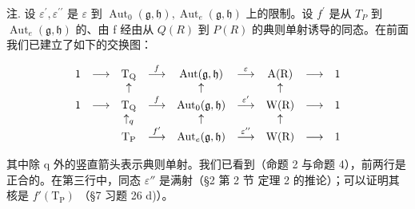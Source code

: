 注. 设 \(\varepsilon^{\prime},\varepsilon^{\prime\prime}\) 是 \(\varepsilon\) 到 \(\operatorname{Aut}_{0}(\mathfrak{g},\mathfrak{h}),\operatorname{Aut}_{e}(\mathfrak{g},\mathfrak{h})\) 上的限制。设 \(f^{\prime}\) 是从 \(T_{P}\) 到 \(\operatorname{Aut}_{e}(\mathfrak{g},\mathfrak{h})\) 的、由 f 经由从 \(Q(R)\) 到 \(P(R)\) 的典则单射诱导的同态。在前面我们已建立了如下的交换图：

\[
\begin{array}{c c c c c c c c c} 1 & \longrightarrow & \mathrm{T} _ {\mathrm{Q}} & \stackrel {{f}} {{\longrightarrow}} & \mathrm{Aut} (\mathfrak {g}, \mathfrak {h}) & \stackrel {{\varepsilon}} {{\longrightarrow}} & \mathrm{A} (\mathrm{R}) & \longrightarrow & 1 \\ & & \uparrow & & \uparrow & & \uparrow & & \\ 1 & \longrightarrow & \mathrm{T} _ {\mathrm{Q}} & \stackrel {{f}} {{\longrightarrow}} & \mathrm{Aut} _ {0} (\mathfrak {g}, \mathfrak {h}) & \stackrel {{\varepsilon^ {\prime}}} {{\longrightarrow}} & \mathrm{W} (\mathrm{R}) & \longrightarrow & 1 \\ & & \uparrow_ {q} & & \uparrow & & \uparrow & & \\ & & \mathrm{T} _ {\mathrm{P}} & \stackrel {{f ^ {\prime}}} {{\longrightarrow}} & \mathrm{Aut} _ {e} (\mathfrak {g}, \mathfrak {h}) & \stackrel {{\varepsilon^ {\prime \prime}}} {{\longrightarrow}} & \mathrm{W} (\mathrm{R}) & \longrightarrow & 1 \end{array}
\]

其中除 q 外的竖直箭头表示典则单射。我们已看到（命题 2 与命题 4），前两行是正合的。在第三行中，同态 \(\varepsilon''\) 是满射（§2 第 2 节 定理 2 的推论）；可以证明其核是 \(f'(\mathrm{T}_{\mathrm{P}})\) （§7 习题 26 d)）。


